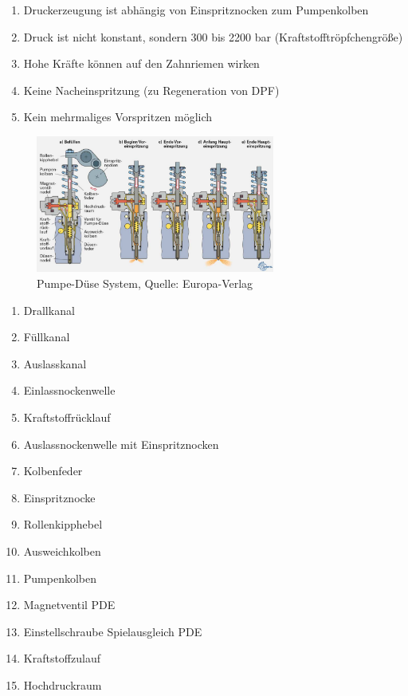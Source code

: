 \begin{enumerate}
\item
  Druckerzeugung ist abhängig von Einspritznocken zum Pumpenkolben
\item
  Druck ist nicht konstant, sondern 300 bis 2200 bar
  (Kraftstofftröpfchengröße)
\item
  Hohe Kräfte können auf den Zahnriemen wirken
\item
  Keine Nacheinspritzung (zu Regeneration von DPF)
\item
  Kein mehrmaliges Vorspritzen möglich
\end{enumerate}

\newpage

\begin{figure}[!ht]%
\centering
\includegraphics[width=0.7\textwidth]{images/Diesel/Diesel-11.pdf}
\caption{Pumpe-Düse System, Quelle: Europa-Verlag}
\end{figure}

\begin{enumerate}
\item
  Drallkanal
\item
  Füllkanal
\item
  Auslasskanal
\item
  Einlassnockenwelle
\item
  Kraftstoffrücklauf
\item
  Auslassnockenwelle mit Einspritznocken
\item
  Kolbenfeder
\item
  Einspritznocke
\item
  Rollenkipphebel
\item
  Ausweichkolben
\item
  Pumpenkolben
\item
  Magnetventil PDE
\item
  Einstellschraube Spielausgleich PDE
\item
  Kraftstoffzulauf
\item
  Hochdruckraum
\end{enumerate}

